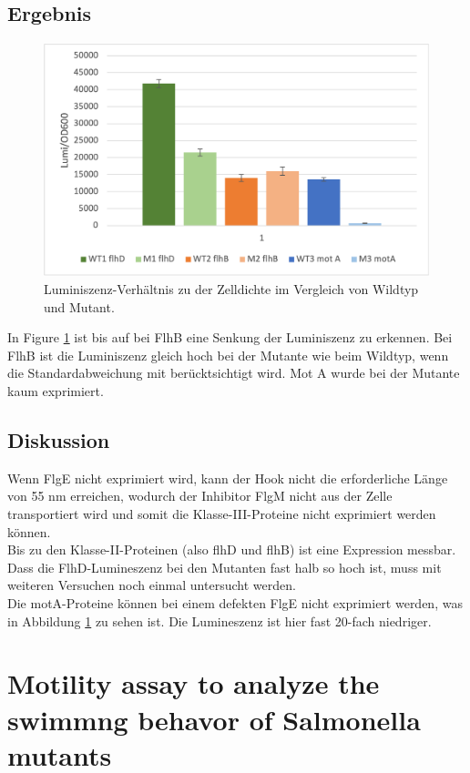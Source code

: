 \documentclass[oneside,10pt,a4paper]{report}
\begin{document}
			\subsection{Ergebnis}
			
				\begin{figure}[H]
				\centering
				\includegraphics[scale=0.7]{Exp6Lumi.png}
				\caption{Luminiszenz-Verhältnis zu der Zelldichte im Vergleich von Wildtyp und Mutant.}
				\label{fig: Lumi}
			\end{figure}
			In Figure \ref{fig: Lumi} ist bis auf bei FlhB eine Senkung der Luminiszenz zu erkennen. Bei FlhB ist die Luminiszenz gleich hoch bei der Mutante wie beim Wildtyp, wenn die Standardabweichung mit berücktsichtigt wird.
			Mot A wurde bei der Mutante kaum exprimiert.
			
			\subsection{Diskussion}
			Wenn FlgE nicht exprimiert wird, kann der Hook nicht die erforderliche Länge von 55 nm erreichen, wodurch der Inhibitor FlgM nicht aus der Zelle transportiert wird und somit die Klasse-III-Proteine nicht exprimiert werden können.\\
			Bis zu den Klasse-II-Proteinen (also flhD und flhB) ist eine Expression messbar. Dass die FlhD-Lumineszenz bei den Mutanten fast halb so hoch ist, muss mit weiteren Versuchen noch einmal untersucht werden.\\
			Die motA-Proteine können bei einem defekten FlgE nicht exprimiert werden, was in Abbildung \ref{fig: Lumi} zu sehen ist. Die Lumineszenz ist hier fast 20-fach niedriger.
			
		\section{Motility assay to analyze the swimmng behavor of Salmonella mutants}
		
\end{document}

